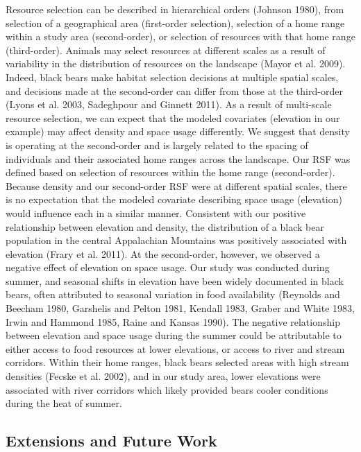 \documentclass[12pt]{article}
\begin{document}
Resource selection can be described in
hierarchical orders (Johnson 1980), from selection of a geographical
area (first-order selection), selection of a home range within a study
area (second-order), or selection of resources with that home range
(third-order).  Animals may select resources at different scales as a
result of variability in the distribution of resources on the
landscape (Mayor et al. 2009).  Indeed, black bears make habitat
selection decisions at multiple spatial scales, and decisions made at
the second-order can differ from those at the third-order (Lyons et
al. 2003, Sadeghpour and Ginnett 2011).  As a result of multi-scale
resource selection, we can expect that the modeled covariates
(elevation in our example) may affect density and space usage
differently.  We suggest that density is operating at the second-order
and is largely related to the spacing of individuals and their
associated home ranges across the landscape.  Our RSF was defined
based on selection of resources within the home range (second-order).
Because density and our second-order RSF were at different spatial
scales, there is no expectation that the modeled covariate describing
space usage (elevation) would influence each in a similar manner.
Consistent with our positive relationship between elevation and
density, the distribution of a black bear population in the central
Appalachian Mountains was positively associated with elevation (Frary
et al. 2011).  At the second-order, however, we observed a negative
effect of elevation on space usage.  Our study was conducted during
summer, and seasonal shifts in elevation have been widely documented
in black bears, often attributed to seasonal variation in food
availability (Reynolds and Beecham 1980, Garshelis and Pelton 1981,
Kendall 1983, Graber and White 1983, Irwin and Hammond 1985, Raine and
Kansas 1990).  The negative relationship between elevation and space
usage during the summer could be attributable to either access to food
resources at lower elevations, or access to river and stream
corridors.  Within their home ranges, black bears selected areas with
high stream densities (Fecske et al. 2002), and in our study area,
lower elevations were associated with river corridors which likely
provided bears cooler conditions during the heat of summer.




\subsection{Extensions and Future Work}
\end{document}

